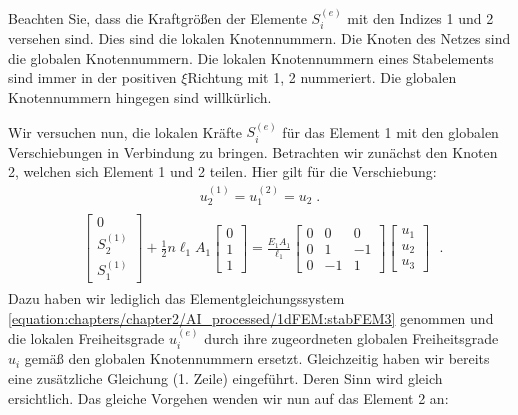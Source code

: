\documentclass[letterpaper,10pt,german]{jupyterBook}
\begin{document}
\sphinxAtStartPar
Beachten Sie, dass die Kraftgrößen der Elemente \(S_i^{(e)}\) mit den Indizes 1 und 2 versehen sind. Dies sind die lokalen Knotennummern. Die Knoten des Netzes sind die globalen Knotennummern. Die lokalen Knotennummern eines Stabelements sind immer in der positiven \(\xi\)\sphinxhyphen{}Richtung mit 1, 2 nummeriert. Die globalen Knotennummern hingegen sind willkürlich.

\sphinxAtStartPar
Wir versuchen nun, die lokalen Kräfte \(S_i^{(e)}\) für das Element 1 mit den globalen Verschiebungen in Verbindung zu bringen. Betrachten wir zunächst den Knoten 2, welchen sich Element 1 und 2 teilen. Hier gilt für die Verschiebung:
\label{equation:chapters/chapter2/1dFEM:ac111fd2-73ac-42e9-b717-b6f3020c9bfb}\begin{align}
  u_2^{(1)} = u_1^{(2)} = u_2 \; .
\end{align}\begin{equation}\label{equation:chapters/chapter2/1dFEM:stabFEM5}
\begin{split}\begin{align}
\begin{bmatrix}
0 \\
S_2^{(1)}\\
S_1^{(1)}
\end{bmatrix} + \frac{1}{2}n\ell_1 A_1 \begin{bmatrix}
0 \\
1\\
1
\end{bmatrix} = \frac{E_1A_1}{\ell_1}\begin{bmatrix}
0 & 0 & 0\\
0 & 1 & -1\\
0 & -1 & 1
\end{bmatrix} \begin{bmatrix}
u_1 \\
u_2\\
u_3
\end{bmatrix}
\end{align} \; .\end{split}
\end{equation}
\sphinxAtStartPar
Dazu haben wir lediglich das Elementgleichungssystem \eqref{equation:chapters/chapter2/AI_processed/1dFEM:stabFEM3} genommen und die lokalen Freiheitsgrade \(u_i^{(e)}\) durch ihre zugeordneten globalen Freiheitsgrade \(u_i\) gemäß den globalen Knotennummern ersetzt. Gleichzeitig haben wir bereits eine zusätzliche Gleichung (1. Zeile) eingeführt. Deren Sinn wird gleich ersichtlich. Das gleiche Vorgehen wenden wir nun auf das Element 2 an:
\end{document}
